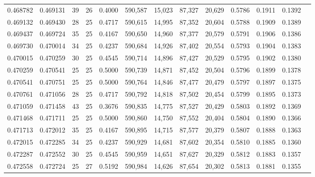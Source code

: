 \begin{tabular}{rrrrrrrrrrrrr}
0.468782 & 0.469131 &    39 &  26 &                                     0.4000 & 590,587 &  15,023 &  87,327 &  20,629 & 0.5786 & 0.1911 & 0.1392 \\
0.469132 & 0.469430 &    28 &  25 &                                     0.4717 & 590,615 &  14,995 &  87,352 &  20,604 & 0.5788 & 0.1909 & 0.1389 \\
0.469437 & 0.469724 &    35 &  25 &                                     0.4167 & 590,650 &  14,960 &  87,377 &  20,579 & 0.5791 & 0.1906 & 0.1386 \\
0.469730 & 0.470014 &    34 &  25 &                                     0.4237 & 590,684 &  14,926 &  87,402 &  20,554 & 0.5793 & 0.1904 & 0.1383 \\
0.470015 & 0.470259 &    30 &  25 &                                     0.4545 & 590,714 &  14,896 &  87,427 &  20,529 & 0.5795 & 0.1902 & 0.1380 \\
0.470259 & 0.470541 &    25 &  25 &                                     0.5000 & 590,739 &  14,871 &  87,452 &  20,504 & 0.5796 & 0.1899 & 0.1378 \\
0.470541 & 0.470751 &    25 &  25 &                                     0.5000 & 590,764 &  14,846 &  87,477 &  20,479 & 0.5797 & 0.1897 & 0.1375 \\
0.470761 & 0.471056 &    28 &  25 &                                     0.4717 & 590,792 &  14,818 &  87,502 &  20,454 & 0.5799 & 0.1895 & 0.1373 \\
0.471059 & 0.471458 &    43 &  25 &                                     0.3676 & 590,835 &  14,775 &  87,527 &  20,429 & 0.5803 & 0.1892 & 0.1369 \\
0.471468 & 0.471711 &    25 &  25 &                                     0.5000 & 590,860 &  14,750 &  87,552 &  20,404 & 0.5804 & 0.1890 & 0.1366 \\
0.471713 & 0.472012 &    35 &  25 &                                     0.4167 & 590,895 &  14,715 &  87,577 &  20,379 & 0.5807 & 0.1888 & 0.1363 \\
0.472015 & 0.472285 &    34 &  25 &                                     0.4237 & 590,929 &  14,681 &  87,602 &  20,354 & 0.5810 & 0.1885 & 0.1360 \\
0.472287 & 0.472552 &    30 &  25 &                                     0.4545 & 590,959 &  14,651 &  87,627 &  20,329 & 0.5812 & 0.1883 & 0.1357 \\
0.472558 & 0.472724 &    25 &  27 &                                     0.5192 & 590,984 &  14,626 &  87,654 &  20,302 & 0.5813 & 0.1881 & 0.1355 \\

\end{tabular}
